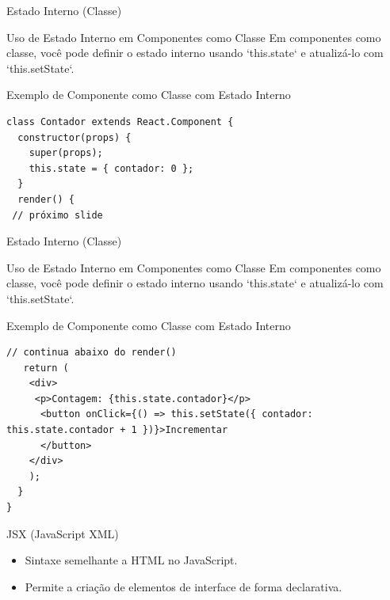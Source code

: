 \documentclass[13pt, xcolor={dvipsnames,svgnames}, portuguese]{beamer}
\begin{document}
\begin{frame}[fragile]{Estado Interno (Classe)}
  \begin{block}{Uso de Estado Interno em Componentes como Classe}
    Em componentes como classe, você pode definir o estado interno usando `this.state` e atualizá-lo com `this.setState`.
  \end{block}
  
  \begin{exampleblock}{Exemplo de Componente como Classe com Estado Interno}
    \begin{verbatim}
class Contador extends React.Component {
  constructor(props) {
    super(props);
    this.state = { contador: 0 };
  }
  render() {
 // próximo slide
    \end{verbatim}
  \end{exampleblock}
\end{frame}


\begin{frame}[fragile]{Estado Interno (Classe)}
  \begin{block}{Uso de Estado Interno em Componentes como Classe}
    Em componentes como classe, você pode definir o estado interno usando `this.state` e atualizá-lo com `this.setState`.
  \end{block}
  
  \begin{exampleblock}{Exemplo de Componente como Classe com Estado Interno}
    \begin{verbatim}
// continua abaixo do render()
   return (
    <div>
     <p>Contagem: {this.state.contador}</p>
      <button onClick={() => this.setState({ contador: this.state.contador + 1 })}>Incrementar
      </button>
    </div>
    ); 
  }
}
    \end{verbatim}
  \end{exampleblock}
\end{frame}



\begin{frame}{JSX (JavaScript XML)}
  \begin{itemize}
    \item Sintaxe semelhante a HTML no JavaScript.
    \pause
    \item Permite a criação de elementos de interface de forma declarativa.
  \end{itemize}
\end{frame}
\end{document}
